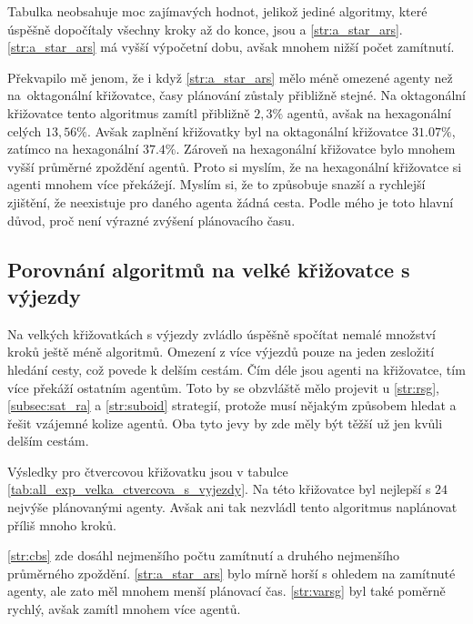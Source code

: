 Tabulka neobsahuje moc zajímavých hodnot, jelikož jediné algoritmy, které úspěšně dopočítaly všechny kroky až do konce,
jsou  a \ref{str:a_star_ars}.
\ref{str:a_star_ars} má vyšší výpočetní dobu, avšak mnohem nižší počet zamítnutí.

Překvapilo mě jenom, že i když \ref{str:a_star_ars} mělo méně omezené agenty než na~oktagonální křižovatce,
časy plánování zůstaly přibližně stejné.
Na oktagonální křižovatce tento algoritmus zamítl přibližně $2,3\%$ agentů, avšak na hexagonální celých $13,56\%$.
Avšak zaplnění křižovatky byl na oktagonální křižovatce $31.07\%$, zatímco na hexagonální $37.4\%$.
Zároveň na hexagonální křižovatce bylo mnohem vyšší průměrné zpoždění agentů.
Proto si myslím, že na hexagonální křižovatce si agenti mnohem více překážejí.
Myslím si, že to způsobuje snazší a rychlejší zjištění, že neexistuje pro daného agenta žádná cesta.
Podle mého je toto hlavní důvod, proč není výrazné zvýšení plánovacího času.



\subsection{Porovnání algoritmů na velké křižovatce s výjezdy}
\label{subsec:porovnani_algoritmu_na_velke_krizovatce_s_vyjezdy}

Na velkých křižovatkách s výjezdy zvládlo úspěšně spočítat nemalé množství kroků ještě méně algoritmů.
Omezení z více výjezdů pouze na jeden zesložití hledání cesty, což povede k delším cestám.
Čím déle jsou agenti na křižovatce, tím více překáží ostatním agentům.
Toto by se obzvláště mělo projevit u \ref{str:rsg}, \ref{subsec:sat_ra} a \ref{str:suboid} strategií,
protože musí nějakým způsobem hledat a řešit vzájemné kolize agentů.
Oba tyto jevy by zde měly být těžší už jen kvůli delším cestám.

Výsledky pro čtvercovou křižovatku jsou v tabulce \ref{tab:all_exp_velka_ctvercova_s_vyjezdy}.
Na této křižovatce byl  nejlepší s $24$ nejvýše plánovanými agenty.
Avšak ani tak nezvládl tento algoritmus naplánovat příliš mnoho kroků.

\ref{str:cbs} zde dosáhl nejmenšího počtu zamítnutí a druhého nejmenšího průměrného zpoždění.
\ref{str:a_star_ars} bylo mírně horší s ohledem na zamítnuté agenty, ale zato měl mnohem menší plánovací čas.
\ref{str:varsg} byl také poměrně rychlý, avšak zamítl mnohem více agentů.

